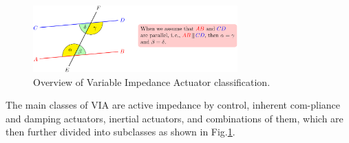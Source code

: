 \documentclass[12pt,a4paper]{article}
\begin{document}
    \begin{figure}[ht]
        \centering
        \includegraphics[width=0.7\textwidth]{figures/fig2.png}
        \caption{Overview of Variable Impedance Actuator classification.}
        \label{fig:VIA_classification}
    \end{figure}

    The main classes of VIA are active impedance by control,
    inherent com-pliance and damping actuators, inertial actuators,
    and combinations of them, which are then further divided into subclasses 
    as shown in Fig.\ref{fig:VIA_classification}.
\end{document}
